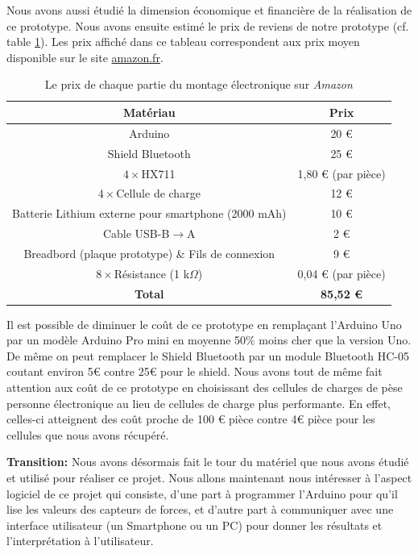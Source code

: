 \documentclass{polytech/polytech}
\begin{document}
Nous avons aussi étudié la dimension économique et financière de la réalisation de ce prototype. 
Nous avons ensuite estimé le prix de reviens de notre prototype (cf. table \ref{tab:prix_amazon}). Les prix affiché dans ce tableau correspondent aux prix moyen disponible sur le site \url{amazon.fr}.

\begin{table}
\begin{center}
\begin{tabular}{| c | c |}
\hline
\textbf{Matériau} & \textbf{Prix} \\\hline\hline
Arduino & 20 € \\\hline
Shield Bluetooth & 25 € \\\hline
$4 \times$HX711 & 1,80 € (par pièce) \\\hline
$4 \times$Cellule de charge & 12 € \\\hline
Batterie Lithium externe pour smartphone (2000 mAh) & 10 € \\\hline
Cable USB-B$\rightarrow$A & 2 € \\\hline
Breadbord (plaque prototype) \& Fils de connexion & 9 € \\\hline
$8 \times$Résistance (1 k$\Omega$) & 0,04 € (par pièce) \\\hline
\textbf{Total} &  \textbf{85,52 €} \\\hline
\end{tabular}
\end{center}
\caption{Le prix de chaque partie du montage électronique sur \textit{Amazon}}
\label{tab:prix_amazon}
\end{table}


Il est possible de diminuer le coût de ce prototype en remplaçant l'Arduino Uno par un modèle Arduino Pro mini en moyenne 50\% moins cher que la version Uno. De même on peut remplacer le Shield Bluetooth par un module Bluetooth HC-05 coutant environ 5€ contre 25€ pour le shield.
Nous avons tout de même fait attention aux coût de ce prototype en choisissant des cellules de charges de pèse personne électronique au lieu de cellules de charge plus performante.
En effet, celles-ci atteignent des coût proche de 100 € pièce contre 4€ pièce pour les cellules que nous avons récupéré.

\textbf{Transition:} Nous avons désormais fait le tour du matériel que nous avons étudié et utilisé pour réaliser ce projet. Nous allons maintenant nous intéresser à l'aspect logiciel de ce projet qui consiste, d'une part à programmer l'Arduino pour qu'il lise les valeurs des capteurs de forces, et d'autre part à communiquer avec une interface utilisateur (un Smartphone ou un PC) pour donner les résultats et l'interprétation à l'utilisateur.
\end{document}
